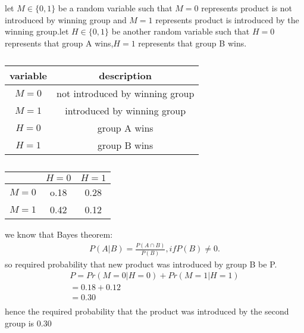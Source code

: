 let $M \in \{0,1\}$ be a random variable such that $M=0$ represents product is not introduced by winning group and $M=1$ represents product is introduced by the winning group.let $H \in \{0,1\}$ be another random variable such that $H=0$ represents that group A wins,$H=1$ represents that group B wins.
\begin{table}[h]
\centering 
\caption{}
\begin{tabular}{|c|c|}
\hline
variable & description \\
\hline
$M = 0$  &not introduced by winning group \\
\hline
$M = 1$  &introduced by winning group \\
\hline
$H = 0$  & group A wins \\
\hline
$H = 1$  & group B wins \\
\hline
\end{tabular}
\label{bayes/2/8/table:1}
\end{table}
\begin{table}[h]
\centering 
\caption{}
\begin{tabular}{|c|c|c|}
\hline
           & $H = 0$  & $H = 1$\\
\hline
$M = 0$  & o.18  & 0.28 \\
\hline
$M = 1$  & 0.42    &  0.12 \\
\hline
\end{tabular}
\label{bayes/2/8/table:}
\end{table}
we know that Bayes theorem:
\begin{align}
P(A|B)=\frac{P(A\cap B)}{P(B)} ,ifP(B)\neq 0.
\end{align}
so required probability that new product was introduced by group B be P.
\begin{align}
 P=Pr(M=0|H=0)+Pr(M=1|H=1)\\
 =0.18+0.12 \\ 
 =0.30\\
\end{align}
hence the required probability that the product was introduced by the second group is 0.30